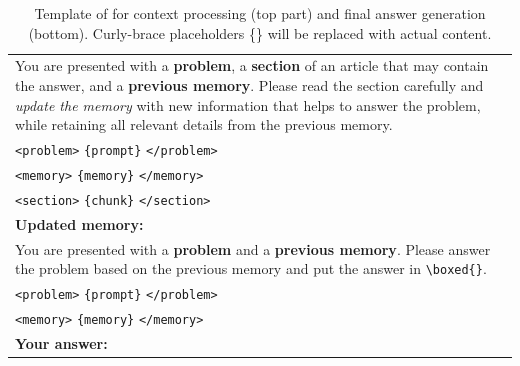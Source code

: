 \begin{table}[t]
  \centering
  \renewcommand{\arraystretch}{1.1}
  \begin{tabularx}{\textwidth}{>{\raggedright\arraybackslash}X}
    \toprule
    You are presented with a \textbf{problem}, a \textbf{section} of an article that
    may contain the answer, and a \textbf{previous memory}.  
    Please read the section carefully and \emph{update the memory} with new
    information that helps to answer the problem, while retaining all relevant
    details from the previous memory.\\[4pt]

    \texttt{<problem>} 
    \texttt{\{prompt\}} 
    \texttt{</problem>} \\[2pt]

    \texttt{<memory>} 
    \texttt{\{memory\}} 
    \texttt{</memory>} \\[2pt]

    \texttt{<section>} 
    \texttt{\{chunk\}} 
    \texttt{</section>} \\[4pt]

    \textbf{Updated memory:}\\
    \midrule
    You are presented with a \textbf{problem} and a \textbf{previous memory}.
    Please answer the problem based on the previous memory and put the answer in
    \verb|\boxed{}|.\\[4pt]

    \texttt{<problem>} 
    \texttt{\{prompt\}} 
    \texttt{</problem>} \\[2pt]

    \texttt{<memory>} 
    \texttt{\{memory\}} 
    \texttt{</memory>} \\[4pt]

    \textbf{Your answer:}\\
    \bottomrule
  \end{tabularx}
  \caption{Template of \method{} for context processing (top part) and final
  answer generation (bottom). Curly-brace placeholders \{\} will be replaced
  with actual content.}
  \label{tab:template}
\end{table}